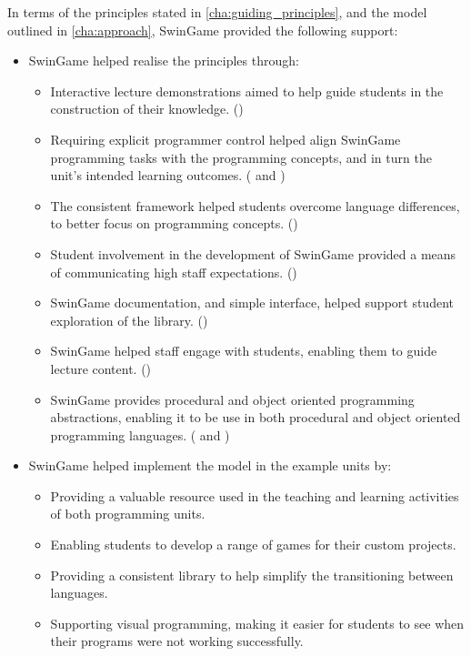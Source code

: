 In terms of the principles stated in \cref{cha:guiding_principles}, and the model outlined in \cref{cha:approach}, SwinGame provided the following support:
\begin{itemize}[noitemsep,nolistsep]
  \item SwinGame helped realise the principles through:
  \begin{itemize}
    \item Interactive lecture demonstrations aimed to help guide students in the construction of their knowledge. ()
    \item Requiring explicit programmer control helped align SwinGame programming tasks with the programming concepts, and in turn the unit's intended learning outcomes. ( and )
    \item The consistent framework helped students overcome language differences, to better focus on programming concepts. ()
    \item Student involvement in the development of SwinGame provided a means of communicating high staff expectations. ()
    \item SwinGame documentation, and simple interface, helped support student exploration of the library. ()
    \item SwinGame helped staff engage with students, enabling them to guide lecture content. ()
    \item SwinGame provides procedural and object oriented programming abstractions, enabling it to be use in both procedural and object oriented programming languages. ( and )
  \end{itemize}
  \item SwinGame helped implement the model in the example units by:
  \begin{itemize}
    \item Providing a valuable resource used in the teaching and learning activities of both programming units.
    \item Enabling students to develop a range of games for their custom projects.
    \item Providing a consistent library to help simplify the transitioning between languages.
    \item Supporting visual programming, making it easier for students to see when their programs were not working successfully.
  \end{itemize}
\end{itemize}

